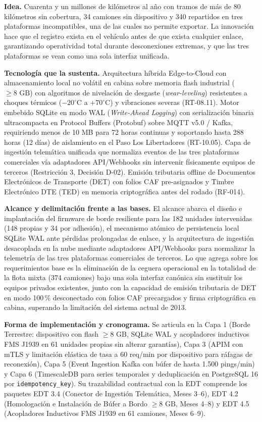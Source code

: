 \textbf{Idea.} Cuarenta y un millones de kilómetros al año con tramos de más de 80 kilómetros sin
cobertura, 34 camiones sin dispositivo y 340 repartidos en tres plataformas incompatibles, una de
las cuales no permite exportar. La innovación hace que el registro exista en el vehículo antes de
que exista cualquier enlace, garantizando operatividad total durante desconexiones extremas, y que
las tres plataformas se vean como una sola interfaz unificada.

\textbf{Tecnología que la sustenta.} Arquitectura híbrida Edge-to-Cloud con almacenamiento local no
volátil en cabina sobre memoria flash industrial ($\ge 8\text{ GB}$) con algoritmos de nivelación de
desgaste (\textit{wear-leveling}) resistentes a choques térmicos ($-20^\circ\text{C}$ a $+70^\circ\text{C}$)
y vibraciones severas (RT-08.11). Motor embebido SQLite en modo WAL (\textit{Write-Ahead Logging}) con
serialización binaria ultracompacta en Protocol Buffers (Protobuf) sobre MQTT v5.0 / Kafka, requiriendo
menos de 10 MB para 72 horas continuas y soportando hasta 288 horas (12 días) de aislamiento en el Paso
Los Libertadores (RT-10.05). Capa de ingestión telemática unificada que normaliza eventos de las tres
plataformas comerciales vía adaptadores API/Webhooks sin intervenir físicamente equipos de terceros
(Restricción 3, Decisión D-02). Emisión tributaria offline de Documentos Electrónicos de Transporte (DET)
con folios CAF pre-asignados y Timbre Electrónico DTE (TED) en memoria criptográfica antes del rodado (RF-014).

\textbf{Alcance y delimitación frente a las bases.} El alcance abarca el diseño e implantación del firmware de borde resiliente para las 182 unidades intervenidas (148 propias y 34 por adhesión), el mecanismo atómico de persistencia local SQLite WAL ante pérdidas prolongadas de enlace, y la arquitectura de ingestión desacoplada en la nube mediante adaptadores API/Webhooks para normalizar la telemetría de las tres plataformas comerciales de terceros. Lo que agrega sobre los requerimientos base es la eliminación de la ceguera operacional en la totalidad de la flota mixta (374 camiones) bajo una sola interfaz canónica sin sustituir los equipos privados existentes, junto con la capacidad de emisión tributaria de DET en modo 100\,\% desconectado con folios CAF precargados y firma criptográfica en cabina, superando la limitación del sistema actual de 2013.

\textbf{Forma de implementación y cronograma.} Se articula en la Capa 1 (Borde Terrestre:
dispositivo con flash $\ge 8\text{ GB}$, SQLite WAL y acopladores inductivos FMS J1939 en 61 unidades
propias sin alterar garantías), Capa 3 (APIM con mTLS y limitación elástica de tasa a 60 req/min por
dispositivo para ráfagas de reconexión), Capa 5 (Event Ingestion Kafka con búfer de hasta 1.500 pings/min)
y Capa 6 (TimescaleDB para series temporales y deduplicación en PostgreSQL 16 por \texttt{idempotency\_key}).
Su trazabilidad contractual con la EDT comprende los paquetes EDT 3.4 (Conector de Ingestión Telemática,
Meses 3--6), EDT 4.2 (Homologación e Instalación de Búfer a Bordo $\ge 8\text{ GB}$, Meses 4--8) y EDT 4.5
(Acopladores Inductivos FMS J1939 en 61 camiones, Meses 6--9).

